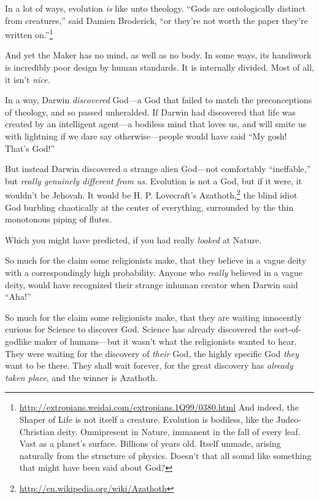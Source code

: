 {
 In a lot of ways, evolution \textit{is} like unto theology.
``Gods are ontologically distinct from
creatures,'' said Damien Broderick,
``or they're not worth the paper
they're written on.''\footnote{\url{http://extropians.weidai.com/extropians.1Q99/0380.html} And indeed, the
Shaper of Life is not itself a creature. Evolution is bodiless, like
the Judeo-Christian deity. Omnipresent in Nature, immanent in the fall
of every leaf. Vast as a planet's surface. Billions of
years old. Itself unmade, arising naturally from the structure of
physics. Doesn't that all sound like something that
might have been said about God?}

{
 And yet the Maker has no mind, as well as no body. In some ways,
its handiwork is incredibly poor design by human standards. It is
internally divided. Most of all, it isn't
\textit{nice.}}

{
 In a way, Darwin \textit{discovered} God---a God that failed to
match the preconceptions of theology, and so passed unheralded. If
Darwin had discovered that life was created by an intelligent agent---a
bodiless mind that loves us, and will smite us with lightning if we
dare say otherwise---people would have said ``My gosh!
That's God!''}

{
 But instead Darwin discovered a strange alien God---not
comfortably ``ineffable,'' but
\textit{really genuinely different from us}. Evolution is not a God,
but if it were, it wouldn't be Jehovah. It would be H.
P. Lovecraft's Azathoth,\footnote{\url{http://en.wikipedia.org/wiki/Azathoth}} the blind idiot God burbling
chaotically at the center of everything, surrounded by the thin
monotonous piping of flutes.}

{
 Which you might have predicted, if you had really \textit{looked}
at Nature.}

{
 So much for the claim some religionists make, that they believe in
a vague deity with a correspondingly high probability. Anyone who
\textit{really} believed in a vague deity, would have recognized their
strange inhuman creator when Darwin said
``Aha!''}

{
 So much for the claim some religionists make, that they are
waiting innocently curious for Science to discover God. Science has
already discovered the sort-of-godlike maker of humans---but it
wasn't what the religionists wanted to hear. They were
waiting for the discovery of \textit{their} God, the highly specific
God \textit{they} want to be there. They shall wait forever, for the
great discovery has \textit{already taken place}, and the winner is
Azathoth.}

}

